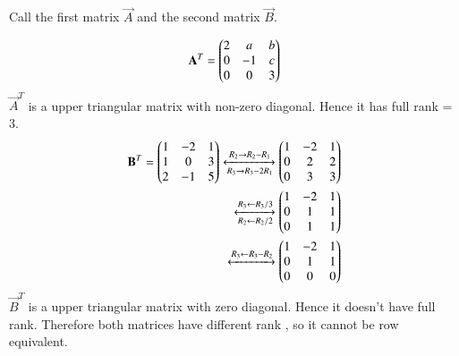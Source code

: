  Call the first matrix $\vec{A}$ and the second matrix $\vec{B}$.
 
  \begin{align}
     \mathbf{A}^{T}=\begin{pmatrix}2&a&b\\0&-1&c\\0&0&3\end{pmatrix}
 \end{align}
 $\vec{A}^{T}$ is a upper triangular matrix with non-zero diagonal. Hence it has full rank = 3.
  \begin{align}
     \mathbf{B}^{T}=\begin{pmatrix}1&-2&1\\1&0&3\\2&-1&5\end{pmatrix}
     \xleftrightarrow[R_3\rightarrow R_3-2R_1]{R_2\rightarrow R_2-R_1}\begin{pmatrix}1&-2&1\\0&2&2\\0&3&3\end{pmatrix}\\
     \xleftrightarrow[R_2\leftarrow R_2/2]{R_3\leftarrow R_3/3}
     \begin{pmatrix}1&-2&1\\0&1&1\\0&1&1\end{pmatrix}\\
     \xleftrightarrow{R_3\leftarrow R_3-R_2} \begin{pmatrix}1&-2&1\\0&1&1\\0&0&0\end{pmatrix}
 \end{align}
   $\vec{B}^{T}$ is a upper triangular matrix with zero diagonal. Hence it doesn't have  full rank.
   Therefore both matrices  have different rank , so it cannot be row equivalent.  
